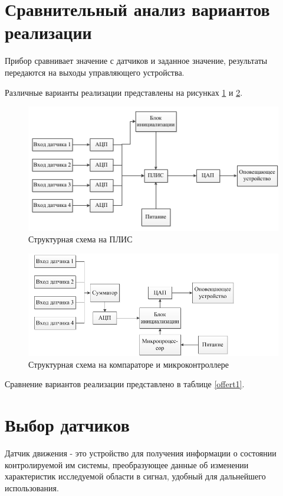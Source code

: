 	\section{Сравнительный анализ вариантов реализации}
		Прибор сравнивает значение с датчиков и заданное значение, результаты передаются на выходы управляющего устройства.

		Различные варианты реализации представлены на рисунках \ref{offerp1} и \ref{offerp2}.
		\begin{figure}[ht!]
			\centering
			\includegraphics[width=150mm]{src/pictures/offerp1.png}
			\caption{Структурная схема на ПЛИС}\label{offerp1}
		\end{figure}
		\begin{figure}[ht!]
			\centering
			\includegraphics[width=150mm]{src/pictures/offerp2.png}
			\caption{Структурная схема на компараторе и микроконтроллере}\label{offerp2}
		\end{figure}

		Сравнение вариантов реализации представлено в таблице \ref{offert1}.
		

	\section{Выбор датчиков}
		Датчик движения - это устройство для получения информации о состоянии контролируемой им системы, преобразующее данные об изменении характеристик исследуемой области в сигнал, удобный для дальнейшего использования.
